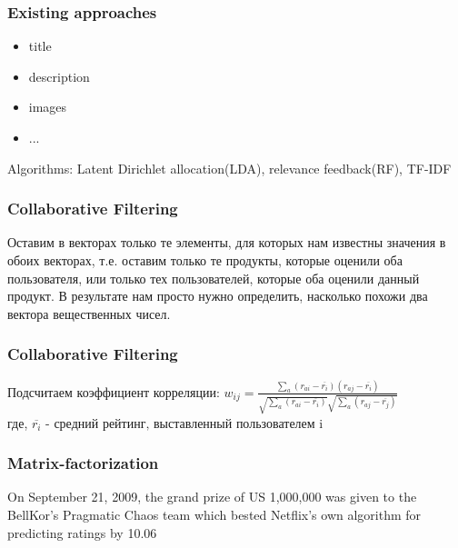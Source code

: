 \documentclass[14pt]{beamer}
\begin{document}
		\begin{frame}
			\frametitle{Existing approaches }
			\begin{itemize}
				\item title
				\item description
				\item images
				\item ...
			\end{itemize}
			Algorithms: Latent Dirichlet allocation(LDA), relevance feedback(RF), TF-IDF  
		\end{frame}
		
		\begin{frame}
			\frametitle{Collaborative Filtering}
				Оставим в векторах только те элементы, для которых нам известны значения в обоих векторах, т.е. оставим только те продукты, которые оценили оба пользователя, или только тех пользователей, которые оба оценили данный продукт. В результате нам просто нужно определить, насколько похожи два вектора вещественных чисел.
		\end{frame}
		
		\begin{frame}
			\frametitle{Collaborative Filtering}
				Подсчитаем коэффициент корреляции:
					$ w_{ij} = \frac{\sum_a{(r_{ai}- \overline{r_i})(r_{aj}- \overline{r_i})}}{\sqrt{ \sum_a{(r_{ai}- \overline{r_i})}}{\sqrt{ \sum_a{(r_{aj}- \overline{r_j})}}}} $ \\
				где, $\overline{r_i} \text{ - средний рейтинг, выставленный пользователем i}$
		\end{frame}
		
		\begin{frame}
			\frametitle{Matrix-factorization}
			On September 21, 2009, the grand prize of US 1,000,000 was given to the BellKor's Pragmatic Chaos team which bested Netflix's own algorithm for predicting ratings by 10.06%
			\begin{figure}[h]
				\begin{minipage}[h]{1\linewidth}
				\end{minipage}
			\end{figure}
		\end{frame}
\end{document}
